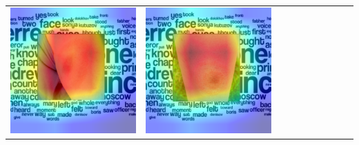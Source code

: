 \begin{landscape}
\begin{table}[]
\begin{tabular}{@{}c c c c c c c c c c@{}}
			\includegraphics[width=.12\textheight ,keepaspectratio]{images/pretraining/gradcam/3/MobileNetV2CombinedGradCam.png} &
			\includegraphics[width=.12\textheight ,keepaspectratio]{images/pretraining/gradcam/9/MobileNetV2CombinedGradCam.png} &

\end{tabular}
\end{table}
\end{landscape}
